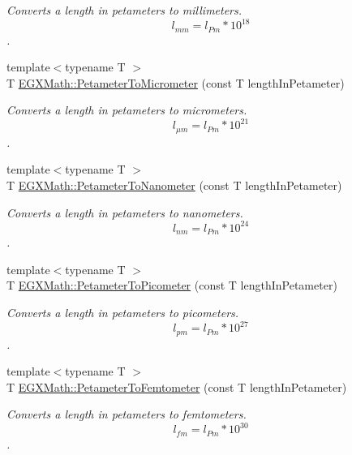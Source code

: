 \begin{DoxyCompactItemize}
\begin{DoxyCompactList}\small\item\em Converts a length in petameters to millimeters. \[ l_{mm}=l_{Pm} * 10^{18} \]. \end{DoxyCompactList}\item 
{\footnotesize template$<$typename T $>$ }\\T \mbox{\hyperlink{group___e_g_x_math-_conversions-_length_conversions-_s_i-_petameter-_s_i_ga3cbe403b66dcb4d5abca922fc48a9a1c}{E\+G\+X\+Math\+::\+Petameter\+To\+Micrometer}} (const T length\+In\+Petameter)
\begin{DoxyCompactList}\small\item\em Converts a length in petameters to micrometers. \[ l_{\mu m}=l_{Pm} * 10^{21} \]. \end{DoxyCompactList}\item 
{\footnotesize template$<$typename T $>$ }\\T \mbox{\hyperlink{group___e_g_x_math-_conversions-_length_conversions-_s_i-_petameter-_s_i_ga34b9bf3c48321cabdc394ab86a2e7cd7}{E\+G\+X\+Math\+::\+Petameter\+To\+Nanometer}} (const T length\+In\+Petameter)
\begin{DoxyCompactList}\small\item\em Converts a length in petameters to nanometers. \[ l_{nm}=l_{Pm} * 10^{24} \]. \end{DoxyCompactList}\item 
{\footnotesize template$<$typename T $>$ }\\T \mbox{\hyperlink{group___e_g_x_math-_conversions-_length_conversions-_s_i-_petameter-_s_i_ga092df775702bdd1b027e20a243d0aa75}{E\+G\+X\+Math\+::\+Petameter\+To\+Picometer}} (const T length\+In\+Petameter)
\begin{DoxyCompactList}\small\item\em Converts a length in petameters to picometers. \[ l_{pm}=l_{Pm} * 10^{27} \]. \end{DoxyCompactList}\item 
{\footnotesize template$<$typename T $>$ }\\T \mbox{\hyperlink{group___e_g_x_math-_conversions-_length_conversions-_s_i-_petameter-_s_i_ga295c384b3674727367d592d2b721fcd2}{E\+G\+X\+Math\+::\+Petameter\+To\+Femtometer}} (const T length\+In\+Petameter)
\begin{DoxyCompactList}\small\item\em Converts a length in petameters to femtometers. \[ l_{fm}=l_{Pm} * 10^{30} \]. \end{DoxyCompactList}\item 

\end{DoxyCompactItemize}
